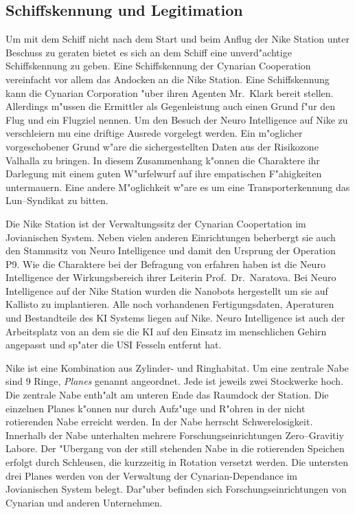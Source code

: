 \subsection{Schiffskennung und Legitimation}
Um mit dem Schiff nicht nach dem Start und beim Anflug der Nike Station unter Beschuss zu geraten bietet es sich an dem Schiff eine unverd"achtige Schiffskennung zu geben. Eine Schiffskennung der Cynarian Cooperation vereinfacht vor allem das Andocken an die Nike Station. Eine Schiffskennung kann die Cynarian Corporation "uber ihren Agenten Mr.~Klark bereit stellen. Allerdings m"ussen die Ermittler als Gegenleistung auch einen Grund f"ur den Flug und ein Flugziel nennen. Um den Besuch der Neuro Intelligence auf Nike zu verschleiern mu\3 eine driftige Ausrede vorgelegt werden. Ein m"oglicher vorgeschobener Grund w"are die sichergestellten Daten aus der Risikozone Valhalla zu bringen. In diesem Zusammenhang k"onnen die Charaktere ihr Darlegung mit einem guten W"urfelwurf auf ihre empatischen F"ahigkeiten untermauern. Eine andere M"oglichkeit w"are es um eine Transporterkennung das Lun--Syndikat zu bitten.


Die Nike Station ist der Verwaltungssitz der Cynarian Coopertation im Jovianischen System. Neben vielen anderen Einrichtungen beherbergt sie auch den Stammsitz von Neuro Intelligence und damit den Ursprung der Operation P9. Wie die Charaktere bei der Befragung von \ml{} erfahren haben ist die Neuro Intelligence der Wirkungsbereich ihrer Leiterin Prof.~Dr.~Naratova. Bei Neuro Intelligence auf der Nike Station wurden die Nanobots hergestellt um sie auf Kallisto zu implantieren. Alle noch vorhandenen Fertigungsdaten, Aperaturen und Bestandteile des KI Systems liegen auf Nike. Neuro Intelligence ist auch der Arbeitsplatz von \ml{} an dem sie die KI auf den Einsatz im menschlichen Gehirn angepasst und sp"ater die USI Fesseln entfernt hat.

Nike ist eine Kombination aus Zylinder- und Ringhabitat. Um eine zentrale Nabe sind 9 Ringe, \emph{Planes} genannt angeordnet. Jede ist jeweils zwei Stockwerke hoch. Die zentrale Nabe enth"alt am unteren Ende das Raumdock der Station.  Die einzelnen Planes k"onnen nur durch Aufz"uge und R"ohren in der nicht rotierenden Nabe erreicht werden. In der Nabe herrscht Schwerelosigkeit. Innerhalb der Nabe unterhalten mehrere Forschungseinrichtungen Zero--Gravitiy Labore. Der "Ubergang von der still stehenden Nabe in die rotierenden Speichen erfolgt durch Schleusen, die kurzzeitig in Rotation versetzt werden. Die untersten drei Planes werden von der Verwaltung der Cynarian-Dependance im Jovianischen System belegt. Dar"uber befinden sich Forschungseinrichtungen von Cynarian und anderen Unternehmen.

